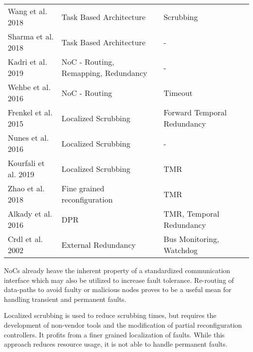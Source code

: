 \begin{strip}
\begin{tabularx}{\textwidth}{lll >{\arraybackslash}X}
       \cite{wang_dynamic_2018} Wang et al. 2018            & Task Based Architecture      & Scrubbing \\
       \cite{sharma2018} Sharma et al. 2018       & Task Based Architecture      & - \\
       \cite{kadri_survey_2019} Kadri et al. 2019           & NoC - Routing, Remapping, Redundancy                        & - \\
       \cite{wehbe_secure_2016} Wehbe et al. 2016           & NoC - Routing               & Timeout\\
       \cite{frenkel2015} Frenkel et al. 2015               & Localized Scrubbing       & Forward Temporal Redundancy \\
       \cite{nunes_improving_2016} Nunes et al. 2016        & Localized Scrubbing         & - \\
       \cite{kourfali2019} Kourfali et al. 2019             & Localized Scrubbing           & TMR \\
       \cite{zhao_fine-grained_2018} Zhao et al. 2018       & Fine grained reconfiguration & TMR \\
       \cite{alkady_integration_2016} Alkady et al. 2016    & \gls{DPR}             & TMR, Temporal Redundancy \\
       \cite{crdl2002} Crdl et al. 2002          & External Redundancy           & Bus Monitoring, Watchdog \\
       \bottomrule
   \end{tabularx}
\end{strip}
\glspl{NoC} already heave the inherent property of a standardized communication interface which may also be utilized to increase fault tolerance.
Re-routing of data-paths to avoid faulty or malicious nodes proves to be a useful mean for handling transient and permanent faults.

Localized scrubbing is used to reduce scrubbing times, but requires the development of non-vendor tools and the modification of partial reconfiguration controllers.
It profits from a finer grained localization of faults.
While this approach reduces resource usage, it is not able to handle permanent faults. 
